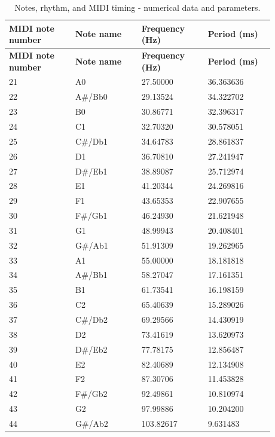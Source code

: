 \documentclass[11pt,a4paper]{article}
\begin{document}
\begingroup\small\setlength{\tabcolsep}{3pt}\renewcommand{\arraystretch}{1.18}\begin{longtable}{@{}p{0.2200\linewidth}p{0.2200\linewidth}p{0.2200\linewidth}p{0.2200\linewidth}@{}}
\caption{Notes, rhythm, and MIDI timing - numerical data and parameters.}\label{tab:010_p004_table20}\\\toprule
\textbf{MIDI note number} & \textbf{Note name} & \textbf{Frequency (Hz)} & \textbf{Period (ms)} \\ \midrule\endfirsthead \textbf{MIDI note number} & \textbf{Note name} & \textbf{Frequency (Hz)} & \textbf{Period (ms)} \\ \midrule\endhead
21 & A0 & 27.50000 & 36.363636 \\
22 & A\#/\allowbreak{}Bb0 & 29.13524 & 34.322702 \\
23 & B0 & 30.86771 & 32.396317 \\
24 & C1 & 32.70320 & 30.578051 \\
25 & C\#/\allowbreak{}Db1 & 34.64783 & 28.861837 \\
26 & D1 & 36.70810 & 27.241947 \\
27 & D\#/\allowbreak{}Eb1 & 38.89087 & 25.712974 \\
28 & E1 & 41.20344 & 24.269816 \\
29 & F1 & 43.65353 & 22.907655 \\
30 & F\#/\allowbreak{}Gb1 & 46.24930 & 21.621948 \\
31 & G1 & 48.99943 & 20.408401 \\
32 & G\#/\allowbreak{}Ab1 & 51.91309 & 19.262965 \\
33 & A1 & 55.00000 & 18.181818 \\
34 & A\#/\allowbreak{}Bb1 & 58.27047 & 17.161351 \\
35 & B1 & 61.73541 & 16.198159 \\
36 & C2 & 65.40639 & 15.289026 \\
37 & C\#/\allowbreak{}Db2 & 69.29566 & 14.430919 \\
38 & D2 & 73.41619 & 13.620973 \\
39 & D\#/\allowbreak{}Eb2 & 77.78175 & 12.856487 \\
40 & E2 & 82.40689 & 12.134908 \\
41 & F2 & 87.30706 & 11.453828 \\
42 & F\#/\allowbreak{}Gb2 & 92.49861 & 10.810974 \\
43 & G2 & 97.99886 & 10.204200 \\
44 & G\#/\allowbreak{}Ab2 & 103.82617 & 9.631483 \\

\end{longtable}
\end{document}
